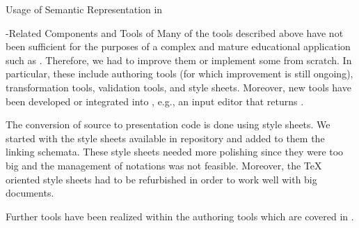 \begin{omgroup}[id=activemath,short=ActiveMath,
  creators={melis,goguadse,alberto,frischauf,homik,libbrecht,cullrich}]
\begin{omgroup}{Usage of Semantic Representation in {\activemath}}
\begin{omgroup}{{\omdoc}-Related Components and Tools of {\activemath}}
Many of the tools described above have not been sufficient for the purposes of a complex
and mature educational application such as {\activemath}.  Therefore, we had to improve
them or implement some from scratch. In particular, these include authoring tools (for
which improvement is still ongoing), transformation tools, validation tools, and
style sheets. Moreover, new tools have been developed or integrated into {\activemath},
e.g., an input editor that returns {\openmath}.

The conversion of {\omdoc} source to presentation code is done using {\xslt} style sheets. 
We started with the style sheets available in {\omdoc} repository and added to them the
{\activemath} linking schemata.
These style sheets needed more polishing since they were too big and the management of
notations was not feasible.  Moreover, the {\TeX} oriented style sheets had to be
refurbished in order to work well with big documents.

Further tools have been realized within the authoring tools which are covered in
{}.
\end{omgroup}
\end{omgroup}
\end{omgroup}


